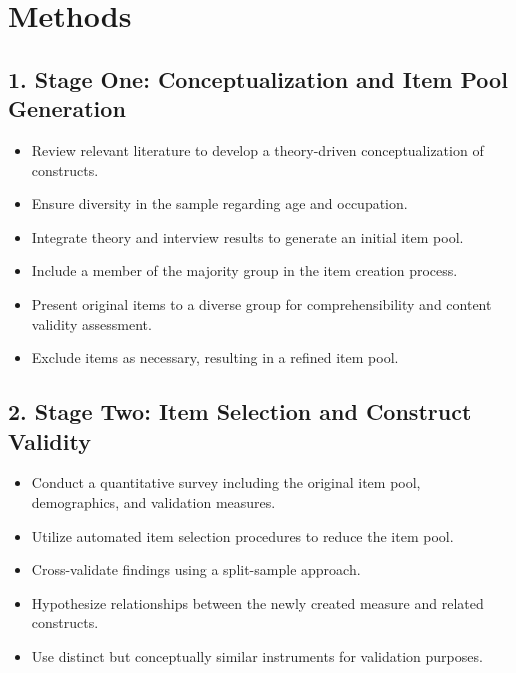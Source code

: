 \documentclass[
  12pt,
  a4paper,
  twoside]{article}
\providecommand{\tightlist}{%
  \setlength{\itemsep}{0pt}\setlength{\parskip}{0pt}}
\begin{document}
\hypertarget{methods}{%
\section{Methods}\label{methods}}

\hypertarget{stage-one-conceptualization-and-item-pool-generation}{%
\subsection{1. Stage One: Conceptualization and Item Pool Generation}\label{stage-one-conceptualization-and-item-pool-generation}}

\begin{itemize}
\tightlist
\item
  Review relevant literature to develop a theory-driven conceptualization of constructs.
\item
  Ensure diversity in the sample regarding age and occupation.
\item
  Integrate theory and interview results to generate an initial item pool.
\item
  Include a member of the majority group in the item creation process.
\item
  Present original items to a diverse group for comprehensibility and content validity assessment.
\item
  Exclude items as necessary, resulting in a refined item pool.
\end{itemize}

\hypertarget{stage-two-item-selection-and-construct-validity}{%
\subsection{2. Stage Two: Item Selection and Construct Validity}\label{stage-two-item-selection-and-construct-validity}}

\begin{itemize}
\tightlist
\item
  Conduct a quantitative survey including the original item pool, demographics, and validation measures.
\item
  Utilize automated item selection procedures to reduce the item pool.
\item
  Cross-validate findings using a split-sample approach.
\item
  Hypothesize relationships between the newly created measure and related constructs.
\item
  Use distinct but conceptually similar instruments for validation purposes.
\end{itemize}
\end{document}
